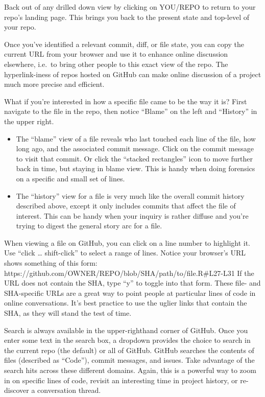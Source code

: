 \documentclass[
  letterpaper,
  DIV=11,
  numbers=noendperiod]{scrreport}
\begin{document}
Back out of any drilled down view by clicking on YOU/REPO to return to
your repo's landing page. This brings you back to the present state and
top-level of your repo.

Once you've identified a relevant commit, diff, or file state, you can
copy the current URL from your browser and use it to enhance online
discussion elsewhere, i.e.~to bring other people to this exact view of
the repo. The hyperlink-iness of repos hosted on GitHub can make online
discussion of a project much more precise and efficient.

What if you're interested in how a specific file came to be the way it
is? First navigate to the file in the repo, then notice ``Blame'' on the
left and ``History'' in the upper right.

\begin{itemize}
\item
  The ``blame'' view of a file reveals who last touched each line of the
  file, how long ago, and the associated commit message. Click on the
  commit message to visit that commit. Or click the ``stacked
  rectangles'' icon to move further back in time, but staying in blame
  view. This is handy when doing forensics on a specific and small set
  of lines.
\item
  The ``history'' view for a file is very much like the overall commit
  history described above, except it only includes commits that affect
  the file of interest. This can be handy when your inquiry is rather
  diffuse and you're trying to digest the general story arc for a file.
\end{itemize}

When viewing a file on GitHub, you can click on a line number to
highlight it. Use ``click \ldots{} shift-click'' to select a range of
lines. Notice your browser's URL shows something of this form:
https://github.com/OWNER/REPO/blob/SHA/path/to/file.R\#L27-L31 If the
URL does not contain the SHA, type ``y'' to toggle into that form. These
file- and SHA-specific URLs are a great way to point people at
particular lines of code in online conversations. It's best practice to
use the uglier links that contain the SHA, as they will stand the test
of time.

Search is always available in the upper-righthand corner of GitHub. Once
you enter some text in the search box, a dropdown provides the choice to
search in the current repo (the default) or all of GitHub. GitHub
searches the contents of files (described as ``Code''), commit messages,
and issues. Take advantage of the search hits across these different
domains. Again, this is a powerful way to zoom in on specific lines of
code, revisit an interesting time in project history, or re-discover a
conversation thread.
\end{document}
